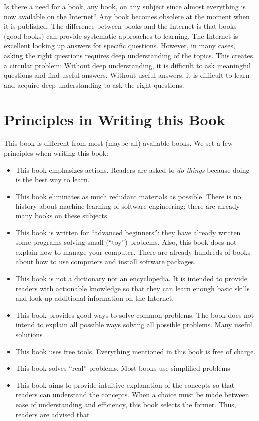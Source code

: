 Is there a need for a book, any book, on any subject since almost
everything is now available on the Internet?  Any book becomes
obsolete at the moment when it is published.  The difference between
books and the Internet is that books (good books) can provide
systematic approaches to learning. The Internet is excellent looking
up answers for specific questions. However, in many cases, asking the
right questions requires deep understanding of the topics.  This
creates a circular problem: Without deep understanding, it is
difficult to ask meaningful questions and find useful answers. Without
useful answers, it is difficult to learn and acquire deep
understanding to ask the right questions.

\section*{Principles in Writing this Book}

This book is different from most (maybe all) available books.
We set a few principles when writing this book:

\begin{itemize}
\item This book emphasizes actions. Readers are asked to {\it do
  things} because doing is the best way to learn.

\item This book eliminates as much redudant materials as
  possible.  There is no history about machine learning
  of software engineering; there are already many books
  on these subjects.

\item This book is written for ``advanced beginners'': they have
  already written some programs solving small (``toy'')
  problems. Also, this book does not explain how to manage your
  computer.  There are already hundreds of books about
  how to use computers and install software packages.

\item This book is not a dictionary nor an encyclopedia.
  It is intended to provide readers with actionable
  knowledge so that they can learn enough basic skills
  and look up additional information on the Internet.

\item This book provides good ways to solve common problems.
  The book does not intend to explain all possible ways
  solving all possible problems. Many useful solutions

\item This book uses free tools. Everything mentioned in
  this book is free of charge.

\item This book solves ``real'' problems.  Most books
  use simplified problems

\item This book aims to provide intuitive explanation of the concepts
  so that readers can understand the concepts.  When a choice must be
  made between ease of understanding and efficiency, this book selects
  the former.  Thus, readers are advised that 
  
\end{itemize}  



